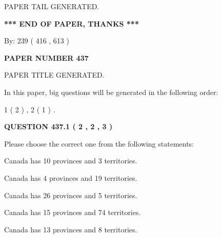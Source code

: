\documentclass[12pt]{article}
\begin{document}
   
   
\vspace{2.0in} PAPER TAIL GENERATED.
   
   
   
   
\vspace{1.0in} 
{\textbf{\large{ *** END OF PAPER, THANKS *** }}} 
   
   
\hspace{1.0in} By: 
 239 ( 416 ,  613 )
   
   
   
   
\newpage 
\setcounter{page}{ 
   437001 } 
   
   
   
   
 {\textbf{ \Large{ PAPER NUMBER  437  }}}
   
   
\vspace{0.2in}
   
   
   
   
   
   
   
   
 \vspace{0.2in}
 
 
 
 
   
   
 PAPER TITLE GENERATED.
   
   
   
\vspace{0.2in}
   
In this paper, big questions will be generated in the following order: 
   
   
   1 ( 2 )
 ,
   2 ( 1 )
 .
  
\vspace{0.2in}
  
{\textbf{\Large{QUESTION
437.1 
 ( 2 , 2 , 3 )
}}}
  
  
Please choose the correct one from the following statements:
 
 
Canada has 10  provinces and 3 territories.
 
 
Canada has   4 provinces and  19 territories.
 
 
Canada has  26 provinces and  5 territories.
 
 
Canada has  15 provinces and  74 territories.
 
 
Canada has  13 provinces and  8 territories.
 
\end{document}
